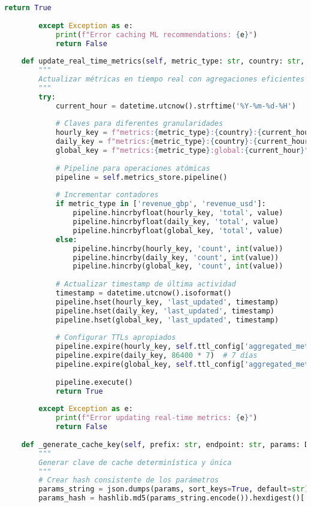 \begin{lstlisting}[language=python, caption=Implementación de Patrones de Caché Avanzados, label=lst:redis_patterns]
            return True
            
        except Exception as e:
            print(f"Error caching ML recommendations: {e}")
            return False
    
    def update_real_time_metrics(self, metric_type: str, country: str, value: float) -> bool:
        """
        Actualizar métricas en tiempo real con agregaciones eficientes
        """
        try:
            current_hour = datetime.utcnow().strftime('%Y-%m-%d-%H')
            
            # Claves para diferentes granularidades
            hourly_key = f"metrics:{metric_type}:{country}:{current_hour}"
            daily_key = f"metrics:{metric_type}:{country}:{current_hour[:10]}"
            global_key = f"metrics:{metric_type}:global:{current_hour}"
            
            # Pipeline para operaciones atómicas
            pipeline = self.metrics_store.pipeline()
            
            # Incrementar contadores
            if metric_type in ['revenue_gbp', 'revenue_usd']:
                pipeline.hincrbyfloat(hourly_key, 'total', value)
                pipeline.hincrbyfloat(daily_key, 'total', value)
                pipeline.hincrbyfloat(global_key, 'total', value)
            else:
                pipeline.hincrby(hourly_key, 'count', int(value))
                pipeline.hincrby(daily_key, 'count', int(value))
                pipeline.hincrby(global_key, 'count', int(value))
            
            # Actualizar timestamp de última actividad
            timestamp = datetime.utcnow().isoformat()
            pipeline.hset(hourly_key, 'last_updated', timestamp)
            pipeline.hset(daily_key, 'last_updated', timestamp)
            pipeline.hset(global_key, 'last_updated', timestamp)
            
            # Configurar TTLs apropiados
            pipeline.expire(hourly_key, self.ttl_config['aggregated_metrics'])
            pipeline.expire(daily_key, 86400 * 7)  # 7 días
            pipeline.expire(global_key, self.ttl_config['aggregated_metrics'])
            
            pipeline.execute()
            return True
            
        except Exception as e:
            print(f"Error updating real-time metrics: {e}")
            return False
    
    def _generate_cache_key(self, prefix: str, endpoint: str, params: Dict) -> str:
        """
        Generar clave de cache determinística y única
        """
        # Crear hash consistente de los parámetros
        params_string = json.dumps(params, sort_keys=True, default=str)
        params_hash = hashlib.md5(params_string.encode()).hexdigest()[:12]
        

\end{lstlisting}
